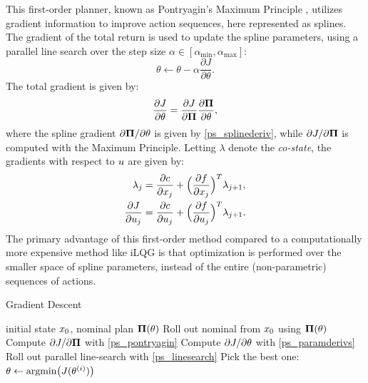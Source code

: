 This first-order planner, known as Pontryagin's Maximum Principle \cite{mangasarian1966sufficient}, utilizes gradient information to improve action sequences, here represented as splines. The gradient of the total return is used to update the spline parameters, using a parallel line search over the step size $\alpha \in [\alpha_{\textrm{min}}, \alpha_{\textrm{max}}]$:
\begin{equation} \label{ps_linesearch}
	\theta \leftarrow \theta - \alpha \frac{\partial J}{\partial \theta}.
\end{equation}
The total gradient is given by:
\begin{equation}\label{ps_paramderivs}
	\frac{\partial J}{\partial \theta} = \frac{\partial J}{\partial {\mathbf{\Pi}}} \frac{\partial {\mathbf{\Pi}}}{\partial \theta},
\end{equation}
where the spline gradient $\partial {\mathbf{\Pi}}/\partial \theta$ is given by \eqref{ps_splinederiv}, while $\partial J/\partial {\mathbf{\Pi}}$ is computed with the Maximum Principle. Letting $\lambda$ denote the \emph{co-state}, the gradients with respect to ${u}$ are given by:
\begin{subequations}\label{ps_pontryagin}
	\begin{align}
		\lambda_{j} &= \frac{\partial c}{\partial {x}_j} + \Bigl(\frac{\partial f}{\partial {x}_j}\Bigr)^T\lambda_{j+1}, \\
		\frac{\partial {J}}{\partial {u}_j} &= \frac{\partial c}{\partial {u}_j} + \Bigl(\frac{\partial f}{\partial {u}_j}\Bigr)^T\lambda_{j+1}.
	\end{align}
\end{subequations}
The primary advantage of this first-order method compared to a computationally more expensive method like iLQG is that optimization is performed over the smaller space of spline parameters, instead of the entire (non-parametric) sequences of actions.

\begin{algorithm}[H]
	\caption{Gradient Descent}\label{ps_gradient_descent_algorithm}
	\begin{algorithmic}[1]
		\Require initial state ${x}_0$, nominal plan ${\mathbf{\Pi}}(\theta)$
		\State Roll out nominal from ${x}_0$ using ${\mathbf{\Pi}}(\theta)$
		\State Compute $\partial {J}/\partial {\mathbf{\Pi}}$ with \eqref{ps_pontryagin}
		\State Compute $\partial {J}/\partial \theta$ with \eqref{ps_paramderivs}
		\State Roll out parallel line-search with \eqref{ps_linesearch}
		\State Pick the best one: $\theta \leftarrow \mbox{argmin} \bigl({J}(\theta^{(i)})\bigr)$
	\end{algorithmic}
\end{algorithm}

